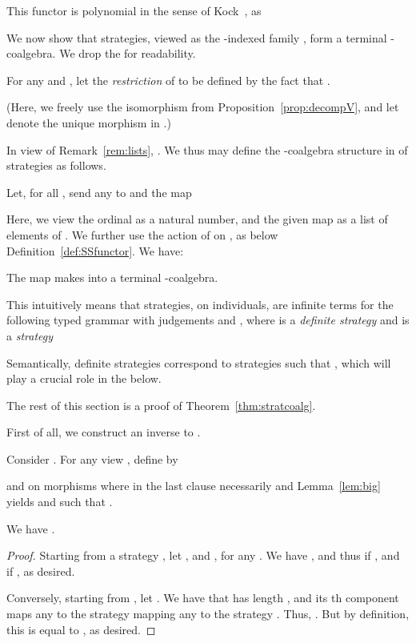\documentclass{LMCS}
\theoremstyle{plain}\newtheorem{satz}[thm]{Satz}
\begin{document}
     \begin{rem}\label{rem:lists}
       This functor is polynomial in the sense of
       Kock~\citep{Kock01012011}, as 
     \end{rem}
     
     We now show that strategies, viewed as the -indexed family
     , form a terminal -coalgebra. We drop 
     the  for readability.
     
     \begin{defi}\label{defi:restr}
       For any  and , let the
       \emph{restriction}  of  to
        be defined by the fact that .
     \end{defi}
     (Here, we freely use the isomorphism  from
     Proposition~\ref{prop:decompV}, and let  denote the unique
     morphism  in .)

     In view of Remark~\ref{rem:lists}, .  We thus may define the -coalgebra structure
      in  of
     strategies as follows.
     \begin{defi}
       Let, for all ,  send any  to  and the map
       
     \end{defi}
     Here, we view the ordinal  as a natural number, and
     the given map  as a list of elements of .  We further use the action of  on , as below
     Definition~\ref{def:SSfunctor}.
We have:
\begin{thm}\label{thm:stratcoalg}
  The map  makes  into a terminal
  -coalgebra.
\end{thm}
This intuitively means that strategies, on individuals, are
infinite terms for the following typed grammar with
judgements  and , where  is a
\emph{definite strategy} and  is a \emph{strategy}
Semantically, definite strategies correspond to strategies  such
that , which will play a crucial role in the \lts{}
below.

The rest of this section is a proof of Theorem~\ref{thm:stratcoalg}. 

First of all, we construct an inverse to .  
\begin{defi}
  Consider . For any view , define  by

and on morphisms 
where in the last clause necessarily  and
Lemma~\ref{lem:big} yields  and 
such that .
\end{defi}
\begin{lem}
  We have .
\end{lem}
\begin{proof}
  Starting from a strategy , let , and
  , for any .
We have , and thus
   if , and  if , as desired.

  Conversely, starting from , let .  We have that  has
  length , and its th component maps any 
  to the strategy mapping any  to the
  strategy . Thus, .  But
  by definition, this is equal to , as desired.  
\end{proof}
\end{document}
